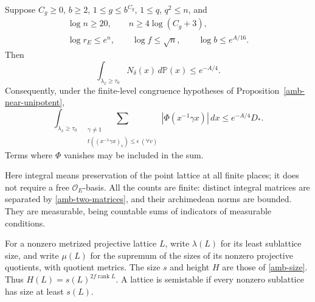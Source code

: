 \begin{theorem}\label{nu-main}
Suppose $C_g\ge0$, $b\ge2$, $1\le g\le b^{C_g}$,
$1\le q$, $q^2\le n$, and
\begin{equation}\label{nu-hypotheses}
 \begin{gathered}
 \log n\ge20,\qquad n\ge4\log(C_g+3),\\
 \log r_E\le e^n,\qquad \log f\le\sqrt n,\qquad
                       \log b\le e^{A/16}.
 \end{gathered}
\end{equation}
Then
\begin{equation}\label{nu-count-integral}
   \int_{\lambda_x\ge\tau_0}N_\delta(x)\,d\mathbb P(x)
                                      \le e^{-A/4}.
\end{equation}
Consequently, under the finite-level congruence
hypotheses of Proposition~\ref{amb-near-unipotent},
\begin{equation}\label{nu-coefficient-integral}
 \int_{\lambda_x\ge\tau_0}
  \sum_{\substack{\gamma\ne1\\
       t((x^{-1}\gamma x)_v)\le\epsilon\ (\forall v)}}
      |\Phi(x^{-1}\gamma x)|\,dx
                                      \le e^{-A/4}D_*.
\end{equation}
Terms where $\Phi$ vanishes may be included in the sum.
\end{theorem}

Here integral means preservation of the point lattice
at all finite places; it does not require a free
$\mathcal O_E$-basis.  All the counts are finite:
distinct integral matrices are separated by
\eqref{amb-two-matrices}, and their archimedean norms
are bounded.  They are measurable, being countable
sums of indicators of measurable conditions.

For a nonzero metrized projective lattice $L$, write
$\lambda(L)$ for its least sublattice size, and write
$\mu(L)$ for the supremum of the sizes of its nonzero
projective quotients, with quotient metrics.
The size $s$ and height $H$ are those of
\eqref{amb-size}.  Thus
$H(L)=s(L)^{2f\operatorname{rank}L}$.
A lattice is semistable if every nonzero sublattice
has size at least $s(L)$.

